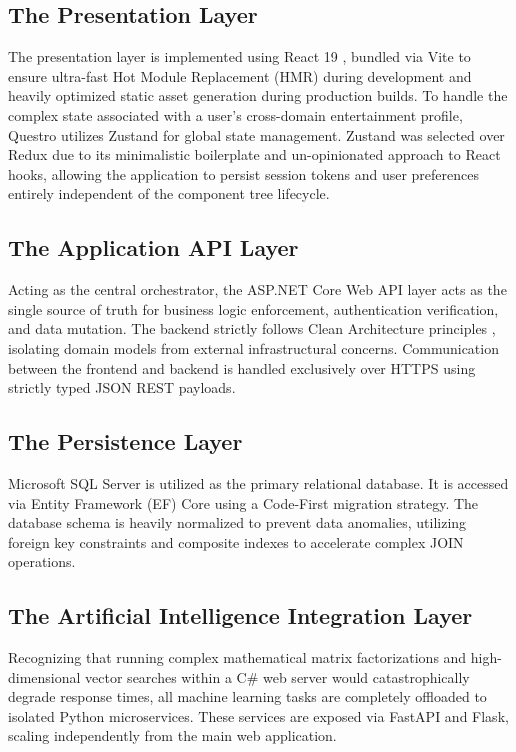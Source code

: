 \subsection{The Presentation Layer}
The presentation layer is implemented using React 19 \cite{react_ref}, bundled via Vite to ensure ultra-fast Hot Module Replacement (HMR) during development and heavily optimized static asset generation during production builds. 
To handle the complex state associated with a user's cross-domain entertainment profile, Questro utilizes Zustand for global state management. Zustand was selected over Redux due to its minimalistic boilerplate and un-opinionated approach to React hooks, allowing the application to persist session tokens and user preferences entirely independent of the component tree lifecycle.

\subsection{The Application API Layer}
Acting as the central orchestrator, the ASP.NET Core Web API layer acts as the single source of truth for business logic enforcement, authentication verification, and data mutation. The backend strictly follows Clean Architecture principles \cite{martin2017clean}, isolating domain models from external infrastructural concerns. Communication between the frontend and backend is handled exclusively over HTTPS using strictly typed JSON REST payloads.

\subsection{The Persistence Layer}
Microsoft SQL Server is utilized as the primary relational database. It is accessed via Entity Framework (EF) Core using a Code-First migration strategy. The database schema is heavily normalized to prevent data anomalies, utilizing foreign key constraints and composite indexes to accelerate complex JOIN operations. 

\subsection{The Artificial Intelligence Integration Layer}
Recognizing that running complex mathematical matrix factorizations and high-dimensional vector searches within a C\# web server would catastrophically degrade response times, all machine learning tasks are completely offloaded to isolated Python microservices. These services are exposed via FastAPI and Flask, scaling independently from the main web application.

